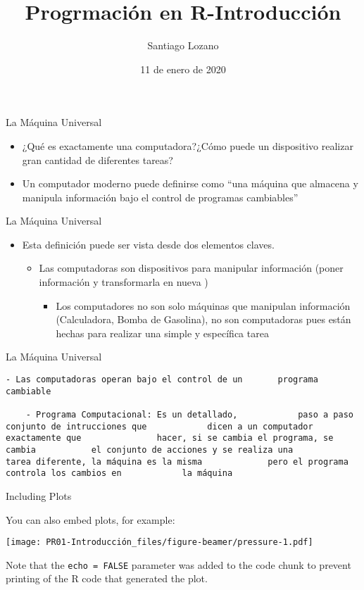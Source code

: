 \documentclass[ignorenonframetext,]{beamer}
\title{Progrmación en R-Introducción}
\author{Santiago Lozano}
\date{11 de enero de 2020}
\providecommand{\tightlist}{%
  \setlength{\itemsep}{0pt}\setlength{\parskip}{0pt}}
\begin{document}
\frame{\titlepage}

\begin{frame}{La Máquina Universal}

\begin{itemize}
\item
  ¿Qué es exactamente una computadora?¿Cómo puede un dispositivo
  realizar gran cantidad de diferentes tareas?
\item
  Un computador moderno puede definirse como ``una máquina que almacena
  y manipula información bajo el control de programas cambiables''
\end{itemize}

\end{frame}

\begin{frame}{La Máquina Universal}

\begin{itemize}
\item
  Esta definición puede ser vista desde dos elementos claves.

  \begin{itemize}
  \item
    Las computadoras son dispositivos para manipular información (poner
    información y transformarla en nueva )

    \begin{itemize}
    \tightlist
    \item
      Los computadores no son solo máquinas que manipulan información
      (Calculadora, Bomba de Gasolina), no son computadoras pues están
      hechas para realizar una simple y específica tarea
    \end{itemize}
  \end{itemize}
\end{itemize}

\end{frame}

\begin{frame}[fragile]{La Máquina Universal}

\begin{verbatim}
- Las computadoras operan bajo el control de un       programa cambiable

    - Programa Computacional: Es un detallado,            paso a paso conjunto de intrucciones que            dicen a un computador exactamente que               hacer, si se cambia el programa, se cambia           el conjunto de acciones y se realiza una            tarea diferente, la máquina es la misma             pero el programa controla los cambios en            la máquina
\end{verbatim}

\end{frame}

\begin{frame}[fragile]{Including Plots}

You can also embed plots, for example:

\texttt{[image: PR01-Introducción\_files/figure-beamer/pressure-1.pdf]}

Note that the \texttt{echo\ =\ FALSE} parameter was added to the code
chunk to prevent printing of the R code that generated the plot.

\end{frame}
\end{document}
